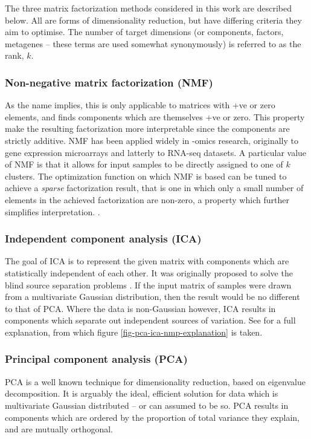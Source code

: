\documentclass[draft,tikz, 12pt,a4paper,oneside,fleqn]{article}
\begin{document}
The three matrix factorization methods considered in this work are described below.  All are forms of dimensionality reduction, but have differing criteria they aim to optimise.  The number of target dimensions (or components, factors, metagenes -- these terms are used somewhat synonymously) is referred to as the rank, $k$.
\subsubsection{Non-negative matrix factorization (NMF)}
\label{sec-nmf}
As the name implies, this is only applicable to matrices with +ve or zero elements, and finds components which are themselves +ve or zero.   This property make the resulting factorization more interpretable since the components are strictly additive.   
NMF has been applied widely in -omics research, originally to gene expression microarrays  and latterly to RNA-seq datasets.  
A particular value of NMF is that it allows for input samples to be directly assigned to one of $k$ clusters.   
The optimization function on which NMF is based can be tuned to achieve a \emph{sparse} factorization result, that is one in which only a small number of elements in the achieved factorization are non-zero, a property which further simplifies interpretation.
\cite{Brunet2004}.
%
\subsubsection{Independent component analysis (ICA)} 
The goal of ICA is to represent the given matrix with components which are statistically independent of each other.  It was originally proposed to solve the blind source separation problems \cite{Comon1994}. If the input matrix of samples were drawn from a multivariate Gaussian distribution, then the result would be no different to that of PCA.    Where the data is non-Gaussian however, ICA results in components which separate out independent sources of variation.  See \cite{Sompairac2019} for a full explanation, from which figure \ref{fig-pca-ica-nmp-explanation} is taken.
\subsubsection{Principal component analysis (PCA)}
PCA is a well known technique for dimensionality reduction, based on eigenvalue decomposition.  It is arguably the ideal, efficient solution for data which is multivariate Gaussian distributed -- or can assumed to be so.  PCA results in components which are ordered by the proportion of total variance they explain, and are mutually orthogonal.
\end{document}
